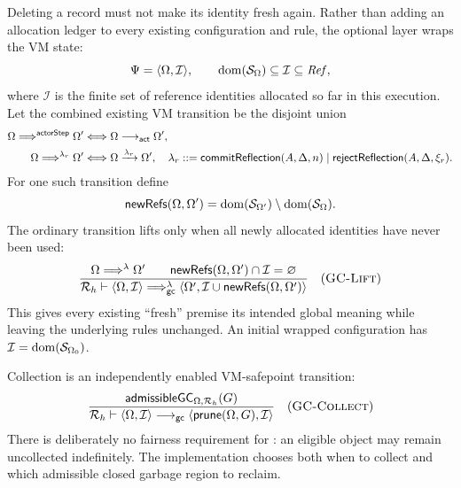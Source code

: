 Deleting a record must not make its identity fresh again.  Rather than adding
an allocation ledger to every existing configuration and rule, the optional
layer wraps the VM state:
\begin{equation}\label{eq:gc-wrapper-state}
 \Psi=\langle\Omega,\mathcal I\rangle,
 \qquad
 \mathop{\mathrm{dom}}(\mathcal S_\Omega)\subseteq\mathcal I\subseteq\mathit{Ref},
\end{equation}
where $\mathcal I$ is the finite set of reference identities allocated so far
in this execution.  Let the combined existing VM transition be the disjoint
union
\begin{equation}\label{eq:gc-underlying-transition}
\begin{aligned}
 \Omega\mathrel{\Longrightarrow^{\mathsf{actorStep}}}\Omega'
  &\Longleftrightarrow \Omega\longrightarrow_{\mathsf{act}}\Omega',\\
 \Omega\mathrel{\Longrightarrow^{\lambda_r}}\Omega'
  &\Longleftrightarrow \Omega\xrightarrow{\lambda_r}\Omega',
 \quad
 \lambda_r::=\mathsf{commitReflection}(A,\Delta,n)
       \mid\mathsf{rejectReflection}(A,\Delta,\xi_r).
\end{aligned}
\end{equation}
For one such transition define
\begin{equation}\label{eq:gc-new-identities}
 \mathsf{newRefs}(\Omega,\Omega')=
   \mathop{\mathrm{dom}}(\mathcal S_{\Omega'})\setminus\mathop{\mathrm{dom}}(\mathcal S_{\Omega}).
\end{equation}
The ordinary transition lifts only when all newly allocated identities have
never been used:
\[
\dfrac{
 \Omega\mathrel{\Longrightarrow^{\lambda}}\Omega'
 \qquad
 \mathsf{newRefs}(\Omega,\Omega')\cap\mathcal I=\varnothing
}{
 \mathcal R_h\vdash\langle\Omega,\mathcal I\rangle
   \mathrel{\Longrightarrow^{\lambda}_{\mathsf{gc}}}
 \langle\Omega',
   \mathcal I\cup\mathsf{newRefs}(\Omega,\Omega')\rangle
}
\quad(\textsc{GC-Lift})
\]
This gives every existing ``fresh'' premise its intended global meaning while
leaving the underlying rules unchanged.  An initial wrapped configuration has
$\mathcal I=\mathop{\mathrm{dom}}(\mathcal S_{\Omega_0})$.

Collection is an independently enabled VM-safepoint transition:
\[
\dfrac{
 \mathsf{admissibleGC}_{\Omega,\mathcal R_h}(G)
}{
 \mathcal R_h\vdash\langle\Omega,\mathcal I\rangle
   \longrightarrow_{\mathsf{gc}}
 \langle\mathsf{prune}(\Omega,G),\mathcal I\rangle
}
\quad(\textsc{GC-Collect})
\]
There is deliberately no fairness requirement for
: an eligible object may remain uncollected indefinitely.
The implementation chooses both when to collect and which admissible closed
garbage region to reclaim.


